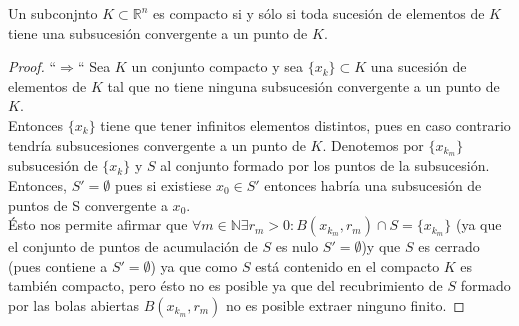 \begin{teorema}
    Un subconjnto $K \subset \mathbb{R}^n$ es compacto si y sólo si toda sucesión de elementos de $K$ tiene una subsucesión convergente a un punto de $K$.
\end{teorema}
\begin{proof}
    ``$\Rightarrow$``
    Sea $K$ un conjunto compacto y sea $\{x_k\} \subset K$ una sucesión de elementos de $K$ tal que no tiene ninguna subsucesión convergente a un punto de $K$. \\
    Entonces $\{x_k\}$ tiene que tener infinitos elementos distintos, pues en caso contrario tendría subsucesiones convergente a un punto de $K$. Denotemos por $\{x_{k_m}\}$ subsucesión de $\{x_k\}$ y $S$ al conjunto formado por los puntos de la subsucesión. Entonces, $S' = \emptyset$ pues si existiese $x_0 \in S'$ entonces habría una subsucesión de puntos de S convergente a $x_0$. \\
    Ésto nos permite afirmar que $\forall m \in \mathbb{N} \exists r_m > 0 : B(x_{k_m}, r_m) \cap S = \{x_{k_m}\}$ (ya que el conjunto de puntos de acumulación de $S$ es nulo $S' = \emptyset$)y que $S$ es cerrado (pues contiene a $S' = \emptyset$) ya que como $S$ está contenido en el compacto $K$ es también compacto, pero ésto no es posible ya que del recubrimiento de $S$ formado por las bolas abiertas $B(x_{k_m}, r_m)$ no es posible extraer ninguno finito. 
    \newline
    \newline


\end{proof}

